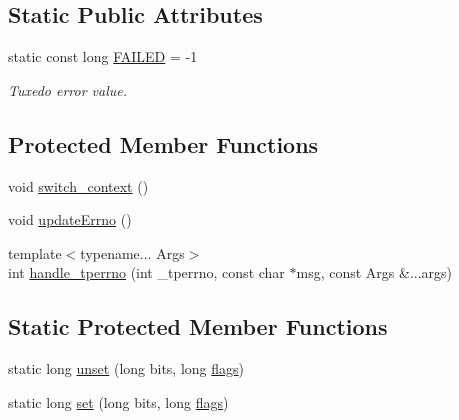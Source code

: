 \subsection*{Static Public Attributes}
\begin{DoxyCompactItemize}
\item 
\hypertarget{classatmi_1_1tuxedo_a79d8805a077e30138729f44c75fcfa5d}{static const long \hyperlink{classatmi_1_1tuxedo_a79d8805a077e30138729f44c75fcfa5d}{F\+A\+I\+L\+E\+D} = -\/1}\label{classatmi_1_1tuxedo_a79d8805a077e30138729f44c75fcfa5d}

\begin{DoxyCompactList}\small\item\em Tuxedo error value. \end{DoxyCompactList}\end{DoxyCompactItemize}
\subsection*{Protected Member Functions}
\begin{DoxyCompactItemize}
\item 
void \hyperlink{classatmi_1_1tuxedo_a90d83b2141d484744a82202f3f66a939}{switch\+\_\+context} ()
\item 
void \hyperlink{classatmi_1_1tuxedo_a1c1d7f2df43e4357788d03977548ac2e}{update\+Errno} ()
\item 
{\footnotesize template$<$typename... Args$>$ }\\int \hyperlink{classatmi_1_1tuxedo_ae8715aedf9c8f3178aec71e93ee35be4}{handle\+\_\+tperrno} (int \+\_\+tperrno, const char $\ast$msg, const Args \&...args)
\end{DoxyCompactItemize}
\subsection*{Static Protected Member Functions}
\begin{DoxyCompactItemize}
\item 
static long \hyperlink{classatmi_1_1tuxedo_af962caf2ded45e192ba6a37740b133d0}{unset} (long bits, long \hyperlink{classatmi_1_1tuxedo_adfebbea0b6599ba8ca87743c55157b82}{flags})
\item 
static long \hyperlink{classatmi_1_1tuxedo_a53a772bbe8c5bb75dadec1c001067e4f}{set} (long bits, long \hyperlink{classatmi_1_1tuxedo_adfebbea0b6599ba8ca87743c55157b82}{flags})
\end{DoxyCompactItemize}
